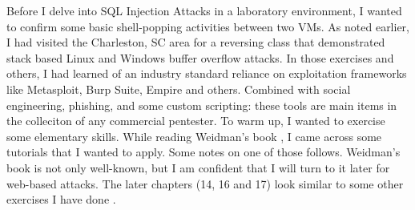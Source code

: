 Before I delve into SQL Injection Attacks in a laboratory environment, I wanted to confirm some basic \gls{shell}-popping activities between two VMs.  As noted earlier, I had visited the Charleston, SC area for a reversing class that demonstrated stack based Linux and Windows buffer overflow attacks.  In those exercises and others, I had learned of an industry standard reliance on exploitation frameworks like Metasploit, Burp Suite, Empire and others.  Combined with social engineering,  \gls{phishing}, and some custom scripting:  these tools are main items in the colleciton of any commercial pentester.  To warm up, I wanted to exercise some elementary skills.  While reading Weidman's book , I came across some tutorials that I wanted to apply.  Some notes on one of those follows.  Weidman's book is not only well-known, but I am confident that I will turn to it later for web-based attacks.  The later chapters (14, 16 and 17) look similar to some other exercises I have done  .

